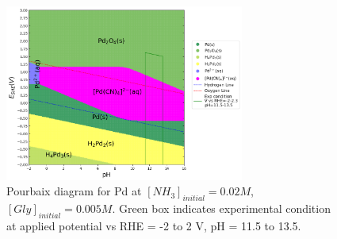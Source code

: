 \documentclass[journal=jacsat,manuscript=article,email=false]{achemso}
\begin{document}
\begin{figure}[htbp]
    \centering
    \includegraphics[width=0.7\textwidth]{Figures/pourbaix_diagrams/Pd-NH3-H2O_activity=1e-04_[NH3]=0.02M_[Gly]=0.005M_[CN]=0.0001.png}
    \caption{Pourbaix diagram for Pd at $[NH_3]_{initial}= 0.02M$, $[Gly]_{initial}=0.005M$. Green box indicates experimental condition at applied potential vs RHE = -2 to 2 V, pH = 11.5 to 13.5.}
    \label{fig:Pd_Pourbaix_NH3_Gly_SI}
\end{figure}
\end{document}
